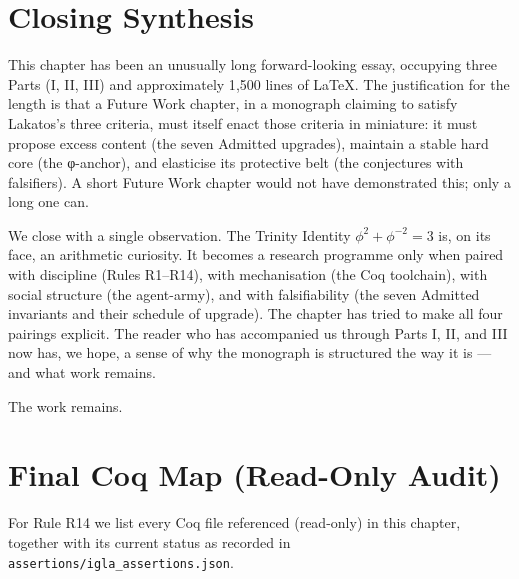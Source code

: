 \section{Closing Synthesis}
\label{sec:31-closing-synthesis}

This chapter has been an unusually long forward-looking essay, occupying three Parts (I, II, III) and approximately 1{,}500 lines of LaTeX. The justification for the length is that a Future Work chapter, in a monograph claiming to satisfy Lakatos's three criteria, must itself enact those criteria in miniature: it must propose excess content (the seven Admitted upgrades), maintain a stable hard core (the φ-anchor), and elasticise its protective belt (the conjectures with falsifiers). A short Future Work chapter would not have demonstrated this; only a long one can.

We close with a single observation. The Trinity Identity $\phi^{2} + \phi^{-2} = 3$ is, on its face, an arithmetic curiosity. It becomes a research programme only when paired with discipline (Rules R1–R14), with mechanisation (the Coq toolchain), with social structure (the agent-army), and with falsifiability (the seven Admitted invariants and their schedule of upgrade). The chapter has tried to make all four pairings explicit. The reader who has accompanied us through Parts I, II, and III now has, we hope, a sense of why the monograph is structured the way it is — and what work remains.

The work remains.

\section{Final Coq Map (Read-Only Audit)}
\label{sec:31-final-coq-map}

For Rule R14 we list every Coq file referenced (read-only) in this chapter, together with its current status as recorded in \texttt{assertions/igla\_assertions.json}.

